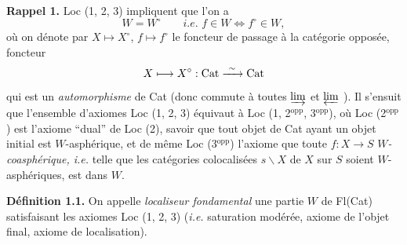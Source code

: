 \textbf{Rappel 1.} Loc (1, 2, 3) impliquent que l’on a
\[
W = W^\circ \qquad \textit{i.e. } f \in W \iff f^\circ \in W,
\]
où on dénote par $X \longmapsto X^\circ$, $f \longmapsto f^\circ$ le foncteur de passage à la catégorie opposée, foncteur
\[
X \longmapsto X^\circ : \Cat \xrightarrow{\ \sim\ } \Cat
\]
qui est un \textit{automorphisme} de Cat (donc commute à toutes $\varinjlim$ et $\varprojlim$ ). Il s’ensuit que l’ensemble d’axiomes Loc (1, 2, 3) équivaut à Loc (1, 2$^{\mathrm{opp}}$, 3$^{\mathrm{opp}}$), où Loc (2$^{\mathrm{opp}}$) est l’axiome “dual” de Loc (2), savoir que tout objet de Cat ayant un objet initial est $W$-asphérique, et de même Loc (3$^{\mathrm{opp}}$) l’axiome que toute $f : X \longrightarrow S$ $W$\textit{-coasphérique, i.e.} telle que les catégories colocalisées $s\backslash X$ de $X$ sur $S$ soient $W$-asphériques, est dans $W$.

\textbf{Définition 1.1.} On appelle \textit{localiseur fondamental} une partie $W$ de Fl(Cat) satisfaisant les axiomes Loc (1, 2, 3) (\textit{i.e.} saturation modérée, axiome de l’objet final, axiome de localisation).


